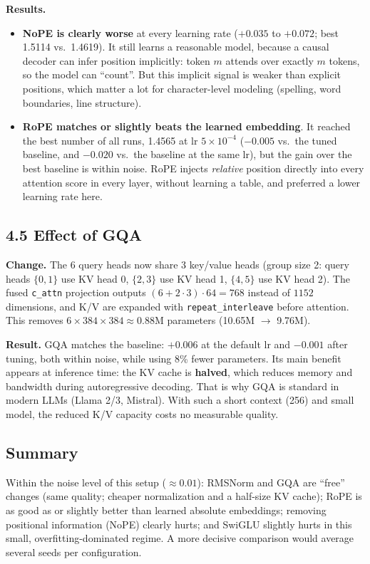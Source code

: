 \documentclass[11pt]{article}
\begin{document}
\textbf{Results.}
\begin{itemize}[leftmargin=1.5em]
\item \textbf{NoPE is clearly worse} at every learning rate ($+0.035$ to $+0.072$; best 1.5114 vs.\ 1.4619). It still learns a reasonable model, because a causal decoder can infer position implicitly: token $m$ attends over exactly $m$ tokens, so the model can ``count''. But this implicit signal is weaker than explicit positions, which matter a lot for character-level modeling (spelling, word boundaries, line structure).
\item \textbf{RoPE matches or slightly beats the learned embedding}. It reached the best number of all runs, 1.4565 at lr $5\times10^{-4}$ ($-0.005$ vs.\ the tuned baseline, and $-0.020$ vs.\ the baseline at the same lr), but the gain over the best baseline is within noise. RoPE injects \emph{relative} position directly into every attention score in every layer, without learning a table, and preferred a lower learning rate here.
\end{itemize}

\subsection*{4.5 Effect of GQA}
\textbf{Change.} The 6 query heads now share 3 key/value heads (group size 2: query heads $\{0,1\}$ use KV head 0, $\{2,3\}$ use KV head 1, $\{4,5\}$ use KV head 2). The fused \texttt{c\_attn} projection outputs $(6+2\cdot3)\cdot64=768$ instead of $1152$ dimensions, and K/V are expanded with \texttt{repeat\_interleave} before attention. This removes $6\times384\times384\approx0.88$M parameters (10.65M $\to$ 9.76M).

\begin{center}\end{center}

\textbf{Result.} GQA matches the baseline: $+0.006$ at the default lr and $-0.001$ after tuning, both within noise, while using 8\% fewer parameters. Its main benefit appears at inference time: the KV cache is \textbf{halved}, which reduces memory and bandwidth during autoregressive decoding. That is why GQA is standard in modern LLMs (Llama 2/3, Mistral). With such a short context (256) and small model, the reduced K/V capacity costs no measurable quality.

\subsection*{Summary}
Within the noise level of this setup ($\approx0.01$): RMSNorm and GQA are ``free'' changes (same quality; cheaper normalization and a half-size KV cache); RoPE is as good as or slightly better than learned absolute embeddings; removing positional information (NoPE) clearly hurts; and SwiGLU slightly hurts in this small, overfitting-dominated regime. A more decisive comparison would average several seeds per configuration.
\end{document}
